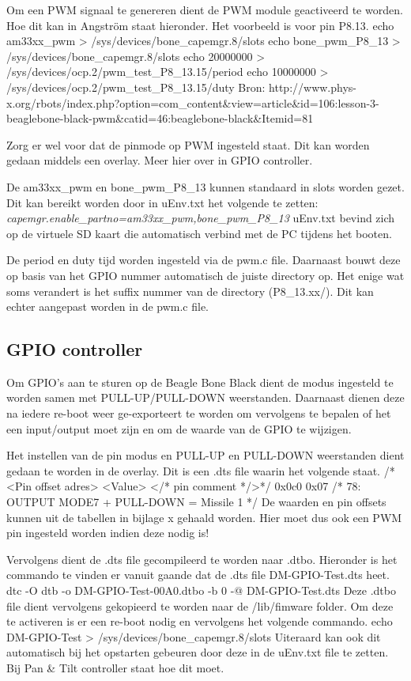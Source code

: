 Om een PWM signaal te genereren dient de PWM module geactiveerd te worden. Hoe 
dit kan in Angström staat hieronder. Het voorbeeld is voor pin P8.13.
echo am33xx_pwm > /sys/devices/bone_capemgr.8/slots
echo bone_pwm_P8_13 > /sys/devices/bone_capemgr.8/slots
echo 20000000 > /sys/devices/ocp.2/pwm_test_P8_13.15/period
echo 10000000 > /sys/devices/ocp.2/pwm_test_P8_13.15/duty
Bron: http://www.phys-x.org/rbots/index.php?option=com_content&view=article&id=106:lesson-3-beaglebone-black-pwm&catid=46:beaglebone-black&Itemid=81

Zorg er wel voor dat de pinmode op PWM ingesteld staat. Dit kan worden gedaan 
middels een overlay. Meer hier over in GPIO controller.

De am33xx_pwm en bone_pwm_P8_13 kunnen standaard in slots worden gezet. Dit kan 
bereikt worden door in uEnv.txt het volgende te zetten:
\emph{capemgr.enable_partno=am33xx_pwm,bone_pwm_P8_13}
uEnv.txt bevind zich op de virtuele SD kaart die automatisch verbind met de PC 
tijdens het booten.

De period en duty tijd worden ingesteld via de pwm.c file. Daarnaast bouwt deze op 
basis van het GPIO nummer automatisch de juiste directory op. Het enige wat 
soms verandert is het suffix nummer van de directory (P8_13.xx/). Dit kan echter 
aangepast worden in de pwm.c file.

\subsection{GPIO controller}
\label{sub:gpiocontr}
Om GPIO's aan te sturen op de Beagle Bone Black dient de modus ingesteld te worden 
samen met PULL-UP/PULL-DOWN weerstanden. Daarnaast dienen deze na iedere re-boot 
weer ge-exporteert te worden om vervolgens te bepalen of het een input/output moet 
zijn en om de waarde van de GPIO te wijzigen.

Het instellen van de pin modus en PULL-UP en PULL-DOWN weerstanden dient gedaan te 
worden in de overlay. Dit is een .dts file waarin het volgende staat.
/* <Pin offset adres> <Value> </* pin comment */>*/
          0x0c0        0x07    /* 78: OUTPUT MODE7 + PULL-DOWN = Missile 1     */
De waarden en pin offsets kunnen uit de tabellen in bijlage x gehaald worden. Hier 
moet dus ook een PWM pin ingesteld worden indien deze nodig is!

Vervolgens dient de .dts file gecompileerd te worden naar .dtbo. Hieronder is het 
commando te vinden er vanuit gaande dat de .dts file DM-GPIO-Test.dts heet.
dtc -O dtb -o DM-GPIO-Test-00A0.dtbo -b 0 -@ DM-GPIO-Test.dts
Deze .dtbo file dient vervolgens gekopieerd te worden naar de /lib/fimware folder. 
Om deze te activeren is er een re-boot nodig en vervolgens het volgende commando.
echo DM-GPIO-Test > /sys/devices/bone_capemgr.8/slots
Uiteraard kan ook dit automatisch bij het opstarten gebeuren door deze in de 
uEnv.txt file te zetten. Bij Pan & Tilt controller staat hoe dit moet.


